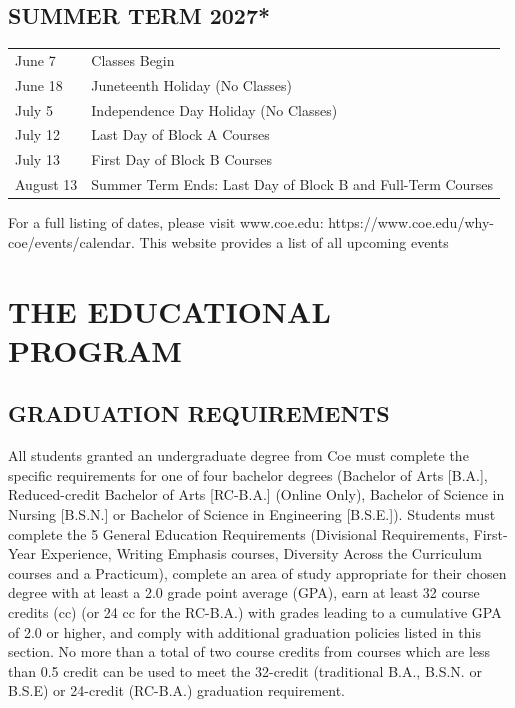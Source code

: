 \documentclass[
  letterpaper,
]{scrbook}
\renewcommand\toprule[2]\relax
\renewcommand\bottomrule[2]\relax
\newcounter{none}
\begin{document}
\section{SUMMER TERM 2027*}\label{summer-term-2027}

{\def\LTcaptype{none} %
\begin{longtable}[]{@{}
  >{\raggedright\arraybackslash}p{}
  >{\raggedleft\arraybackslash}p{}@{}}
\toprule\noalign{}
\endhead
\bottomrule\noalign{}
\endlastfoot
June 7 & Classes Begin \\
June 18 & Juneteenth Holiday (No Classes) \\
July 5 & Independence Day Holiday (No Classes) \\
July 12 & Last Day of Block A Courses \\
July 13 & First Day of Block B Courses \\
August 13 & Summer Term Ends: Last Day of Block B and Full-Term
Courses \\
\end{longtable}
}

For a full listing of dates, please visit www.coe.edu:
https://www.coe.edu/why-coe/events/calendar. This website provides a
list of all upcoming events

\chapter{THE EDUCATIONAL PROGRAM}\label{sec-educational-program}

\section{GRADUATION REQUIREMENTS}\label{graduation-requirements}

All students granted an undergraduate degree from Coe must complete the
specific requirements for one of four bachelor degrees (Bachelor of Arts
{[}B.A.{]}, Reduced-credit Bachelor of Arts {[}RC-B.A.{]} (Online Only),
Bachelor of Science in Nursing {[}B.S.N.{]} or Bachelor of Science in
Engineering {[}B.S.E.{]}). Students must complete the 5 General
Education Requirements (Divisional Requirements, First-Year Experience,
Writing Emphasis courses, Diversity Across the Curriculum courses and a
Practicum), complete an area of study appropriate for their chosen
degree with at least a 2.0 grade point average (GPA), earn at least 32
course credits (cc) (or 24 cc for the RC-B.A.) with grades leading to a
cumulative GPA of 2.0 or higher, and comply with additional graduation
policies listed in this section. No more than a total of two course
credits from courses which are less than 0.5 credit can be used to meet
the 32-credit (traditional B.A., B.S.N. or B.S.E) or 24-credit (RC-B.A.)
graduation requirement.
\end{document}
